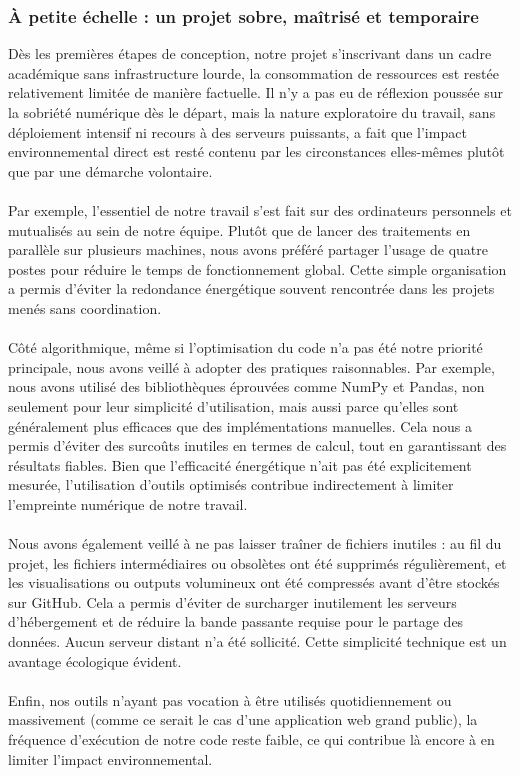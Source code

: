 \documentclass[12pt]{article}
\begin{document}
\subsubsection*{À petite échelle : un projet sobre, maîtrisé et temporaire}
Dès les premières étapes de conception, notre projet s’inscrivant dans un cadre académique sans infrastructure lourde, la consommation de ressources est restée relativement limitée de manière factuelle. Il n’y a pas eu de réflexion poussée sur la sobriété numérique dès le départ, mais la nature exploratoire du travail, sans déploiement intensif ni recours à des serveurs puissants, a fait que l’impact environnemental direct est resté contenu par les circonstances elles-mêmes plutôt que par une démarche volontaire.\\
\\
Par exemple, l’essentiel de notre travail s’est fait sur des ordinateurs personnels et mutualisés au sein de notre équipe. Plutôt que de lancer des traitements en parallèle sur plusieurs machines, nous avons préféré partager l’usage de quatre postes pour réduire le temps de fonctionnement global. Cette simple organisation a permis d’éviter la redondance énergétique souvent rencontrée dans les projets menés sans coordination.\\
\\
Côté algorithmique, même si l’optimisation du code n’a pas été notre priorité principale, nous avons veillé à adopter des pratiques raisonnables. Par exemple, nous avons utilisé des bibliothèques éprouvées comme NumPy et Pandas, non seulement pour leur simplicité d’utilisation, mais aussi parce qu’elles sont généralement plus efficaces que des implémentations manuelles. Cela nous a permis d’éviter des surcoûts inutiles en termes de calcul, tout en garantissant des résultats fiables. Bien que l’efficacité énergétique n’ait pas été explicitement mesurée, l’utilisation d’outils optimisés contribue indirectement à limiter l’empreinte numérique de notre travail.\\
\\
Nous avons également veillé à ne pas laisser traîner de fichiers inutiles : au fil du projet, les fichiers intermédiaires ou obsolètes ont été supprimés régulièrement, et les visualisations ou outputs volumineux ont été compressés avant d’être stockés sur GitHub. Cela a permis d’éviter de surcharger inutilement les serveurs d’hébergement et de réduire la bande passante requise pour le partage des données. Aucun serveur distant n’a été sollicité. Cette simplicité technique est un avantage écologique évident.\\
\\
Enfin, nos outils n’ayant pas vocation à être utilisés quotidiennement ou massivement (comme ce serait le cas d’une application web grand public), la fréquence d’exécution de notre code reste faible, ce qui contribue là encore à en limiter l’impact environnemental.
\end{document}
